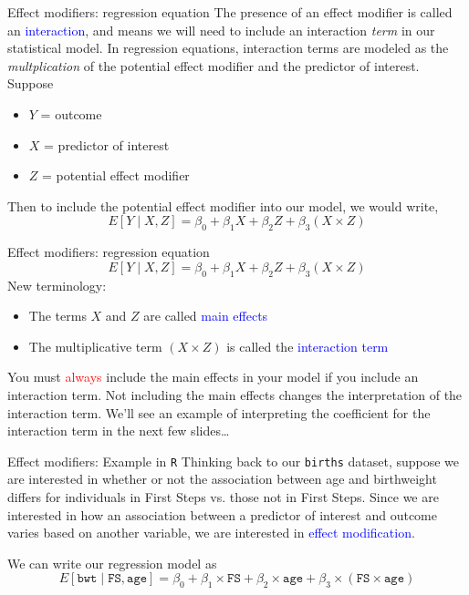 \documentclass[10pt,t]{beamer}
\begin{document}
\begin{frame}{Effect modifiers: regression equation}
The presence of an effect modifier is called an \textcolor{blue}{interaction}, and means we will need to include an interaction \textit{term} in our statistical model. In regression equations, interaction terms are modeled as the \textit{multplication} of the potential effect modifier and the predictor of interest. Suppose
\vspace{0.3cm}

\begin{itemize}
	\item $Y$ = outcome
	\item $X$ = predictor of interest
	\item $Z$ = potential effect modifier
\end{itemize}

\vspace{0.3cm}

Then to include the potential effect modifier into our model, we would write,
$$
E[Y \mid X, Z] = \beta_0 + \beta_1 X + \beta_2 Z + \beta_3 (X \times Z)
$$
\end{frame}

\begin{frame}{Effect modifiers: regression equation}
\vspace{-0.5cm}
$$
E[Y \mid X, Z] = \beta_0 + \beta_1 X + \beta_2 Z + \beta_3 (X \times Z)
$$
New terminology:
\begin{itemize}
	\item The terms $X$ and $Z$ are called \textcolor{blue}{main effects}
	\item The multiplicative term $(X \times Z)$ is called the \textcolor{blue}{interaction term}
\end{itemize}

\vspace{0.3cm}

You must \textcolor{red}{always} include the main effects in your model if you include an interaction term. Not including the main effects changes the interpretation of the interaction term. We'll see an example of interpreting the coefficient for the interaction term in the next few slides\dots

\end{frame}

\begin{frame}{Effect modifiers: Example in \texttt{R}}
Thinking back to our \texttt{births} dataset, suppose we are interested in whether or not the association between age and birthweight differs for individuals in First Steps vs. those not in First Steps. Since we are interested in how an association between a predictor of interest and outcome varies based on another variable, we are interested in \textcolor{blue}{effect modification}. \pause

\vspace{0.3cm}

We can write our regression model as 
$$
E[\texttt{bwt} \mid \texttt{FS}, \texttt{age}] = \beta_0 + \beta_1 \times \texttt{FS} + \beta_2 \times \texttt{age} + \beta_3 \times (\texttt{FS} \times \texttt{age})
$$

\end{frame}
\end{document}
